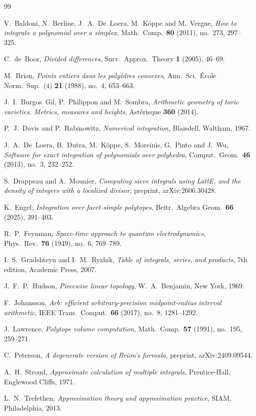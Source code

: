 \documentclass[11pt]{article}
\theoremstyle{remark}
\begin{document}
\begin{thebibliography}{99}

V.~Baldoni, N.~Berline, J.~A.~De~Loera, M.~K\"oppe and M.~Vergne,
\emph{How to integrate a polynomial over a simplex},
Math.\ Comp.\ \textbf{80} (2011), no.~273, 297--325.

C.~de~Boor,
\emph{Divided differences},
Surv.\ Approx.\ Theory \textbf{1} (2005), 46--69.

M.~Brion,
\emph{Points entiers dans les poly\`edres convexes},
Ann.\ Sci.\ \'Ecole Norm.\ Sup.\ (4) \textbf{21} (1988), no.~4, 653--663.

J.~I.~Burgos~Gil, P.~Philippon and M.~Sombra,
\emph{Arithmetic geometry of toric varieties. Metrics, measures and
heights},
Ast\'erisque \textbf{360} (2014).

P.~J.~Davis and P.~Rabinowitz,
\emph{Numerical integration},
Blaisdell, Waltham, 1967.

J.~A.~De~Loera, B.~Dutra, M.~K\"oppe, S.~Moreinis, G.~Pinto and J.~Wu,
\emph{Software for exact integration of polynomials over polyhedra},
Comput.\ Geom.\ \textbf{46} (2013), no.~3, 232--252.

S.~Drappeau and A.~Mounier,
\emph{Computing sieve integrals using LattE, and the density of integers
with a localized divisor},
preprint, arXiv:2606.30428.

K.~Engel,
\emph{Integration over facet-simple polytopes},
Beitr.\ Algebra Geom.\ \textbf{66} (2025), 391--403.

R.~P.~Feynman,
\emph{Space-time approach to quantum electrodynamics},
Phys.\ Rev.\ \textbf{76} (1949), no.~6, 769--789.

I.~S.~Gradshteyn and I.~M.~Ryzhik,
\emph{Table of integrals, series, and products}, 7th edition,
Academic Press, 2007.

J.~F.~P.~Hudson,
\emph{Piecewise linear topology},
W.~A.~Benjamin, New York, 1969.

F.~Johansson,
\emph{Arb: efficient arbitrary-precision midpoint-radius interval
arithmetic},
IEEE Trans.\ Comput.\ \textbf{66} (2017), no.~8, 1281--1292.

J.~Lawrence,
\emph{Polytope volume computation},
Math.\ Comp.\ \textbf{57} (1991), no.~195, 259--271.

C.~Peterson,
\emph{A degenerate version of Brion's formula},
preprint, arXiv:2409.09544.

A.~H.~Stroud,
\emph{Approximate calculation of multiple integrals},
Prentice-Hall, Englewood Cliffs, 1971.

L.~N.~Trefethen,
\emph{Approximation theory and approximation practice},
SIAM, Philadelphia, 2013.

\end{thebibliography}
\end{document}
